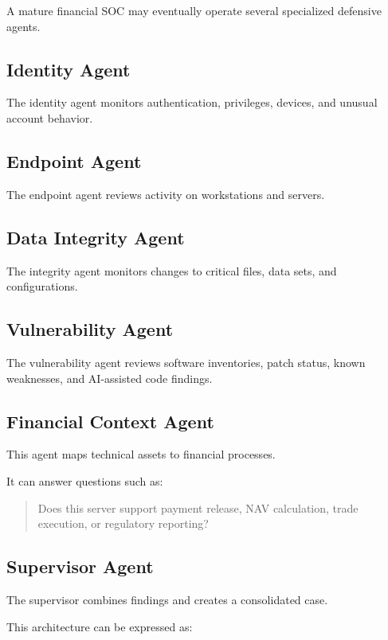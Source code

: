 A mature financial SOC may eventually operate several specialized defensive agents.

\subsection{Identity Agent}

The identity agent monitors authentication, privileges, devices, and unusual account behavior.

\subsection{Endpoint Agent}

The endpoint agent reviews activity on workstations and servers.

\subsection{Data Integrity Agent}

The integrity agent monitors changes to critical files, data sets, and configurations.

\subsection{Vulnerability Agent}

The vulnerability agent reviews software inventories, patch status, known weaknesses, and AI-assisted code findings.

\subsection{Financial Context Agent}

This agent maps technical assets to financial processes.

It can answer questions such as:

\begin{quote}
Does this server support payment release, NAV calculation, trade execution, or regulatory reporting?
\end{quote}

\subsection{Supervisor Agent}

The supervisor combines findings and creates a consolidated case.

This architecture can be expressed as:

